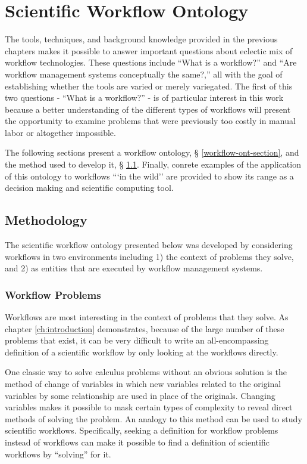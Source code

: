 \chapter{Scientific Workflow Ontology}
\label{ch:workflow-ontology}

The tools, techniques, and background knowledge provided in the previous
chapters makes it possible to answer important questions about eclectic mix of
workflow technologies. These questions include ``What is a workflow?'' and
``Are workflow management systems conceptually the same?,'' all with the goal
of establishing whether the tools are varied or merely variegated. The first of
this two questions - ``What is a workflow?'' - is of particular interest in this
work because a better understanding of the different types of workflows will
present the opportunity to examine problems that were previously too costly in
manual labor or altogether impossible.

The following sections present a workflow ontology, \S
\ref{workflow-ont-section}, and the method used to develop it, \S
\ref{workflow-ont-method}. Finally, conrete examples of the application of this
ontology to workflows ```in the wild'' are provided to show its range as a
decision making and scientific computing tool.

\section{Methodology}
\label{workflow-ont-method}

The scientific workflow ontology presented below was developed by considering
workflows in two environments including 1) the context of problems they solve,
and 2) as entities that are executed by workflow management systems.

\subsection{Workflow Problems}

Workflows are most interesting in the context of problems that they solve. As
chapter \ref{ch:introduction} demonstrates, because of the large number of these
problems that exist, it can be very difficult to write an all-encompassing
definition of a scientific workflow by only looking at the workflows directly. 

One classic way to solve calculus problems without an obvious solution is the
method of change of variables in which new variables related to the original
variables by some relationship are used in place of the originals. Changing
variables makes it possible to mask certain types of complexity to reveal direct
methods of solving the problem. An analogy to this method can be used to study
scientific workflows. Specifically, seeking a definition for workflow problems
instead of workflows can make it possible to find a definition of scientific
workflows by ``solving'' for it. 

